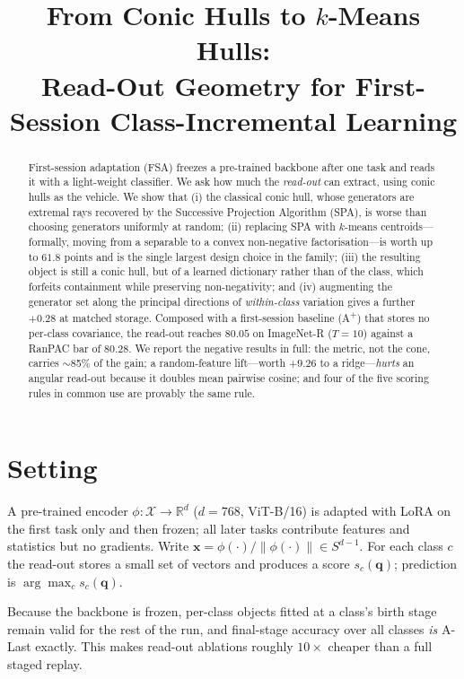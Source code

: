\documentclass[10pt,twocolumn]{article}
\title{\bf From Conic Hulls to $k$-Means Hulls:\\
Read-Out Geometry for First-Session Class-Incremental Learning}
\author{}
\date{}
\newcommand{\R}{\mathbb{R}}
\newcommand{\bx}{\mathbf{x}}
\newcommand{\bq}{\mathbf{q}}
\begin{document}
\maketitle

\begin{abstract}
First-session adaptation (FSA) freezes a pre-trained backbone after one task and
reads it with a light-weight classifier. We ask how much the \emph{read-out} can
extract, using conic hulls as the vehicle. We show that (i) the classical conic
hull, whose generators are extremal rays recovered by the Successive Projection
Algorithm (SPA), is worse than choosing generators uniformly at random; (ii)
replacing SPA with $k$-means centroids---formally, moving from a separable to a
convex non-negative factorisation---is worth up to $61.8$ points and is the
single largest design choice in the family; (iii) the resulting object is still a
conic hull, but of a learned dictionary rather than of the class, which forfeits
containment while preserving non-negativity; and (iv) augmenting the generator
set along the principal directions of \emph{within-class} variation gives a
further $+0.28$ at matched storage. Composed with a first-session baseline
(A\textsuperscript{+}) that stores no per-class covariance, the read-out reaches
$80.05$ on ImageNet-R ($T{=}10$) against a RanPAC bar of $80.28$. We report the
negative results in full: the metric, not the cone, carries $\sim$85\% of the
gain; a random-feature lift---worth $+9.26$ to a ridge---\emph{hurts} an angular
read-out because it doubles mean pairwise cosine; and four of the five scoring
rules in common use are provably the same rule.
\end{abstract}

\section{Setting}

A pre-trained encoder $\phi:\mathcal{X}\to\R^{d}$ ($d{=}768$, ViT-B/16) is adapted
with LoRA on the first task only and then frozen; all later tasks contribute
features and statistics but no gradients. Write $\bx = \phi(\cdot)/\lVert\phi(\cdot)\rVert
\in S^{d-1}$. For each class $c$ the read-out stores a small set of vectors and
produces a score $s_c(\bq)$; prediction is $\arg\max_c s_c(\bq)$.

Because the backbone is frozen, per-class objects fitted at a class's birth stage
remain valid for the rest of the run, and final-stage accuracy over all classes
\emph{is} A-Last exactly. This makes read-out ablations roughly $10\times$ cheaper
than a full staged replay.
\end{document}
